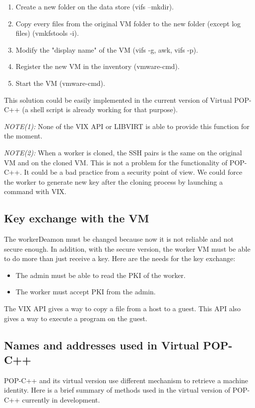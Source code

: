 \begin{enumerate}
\item Create a new folder on the data store (vifs --mkdir).
\item Copy every files from the original VM folder to the new folder (except log files) (vmkfstools -i).
\item Modify the "display name" of the VM (vifs -g, awk, vifs -p).
\item Register the new VM in the inventory (vmware-cmd).
\item Start the VM (vmware-cmd).
\end{enumerate}

This solution could be easily implemented in the current version of Virtual POP-C++ (a shell script is already working for that purpose). \s

\textit{NOTE(1):} None of the VIX API or LIBVIRT is able to provide this function for the moment. \s

\textit{NOTE(2):} When a worker is cloned, the SSH pairs is the same on the original VM and on the cloned VM. This is not a problem for the functionality of POP-C++. It could be a bad practice from a security point of view. We could force the worker to generate new key after the cloning process by launching a command with VIX.  

\subsection{Key exchange with the VM}
The workerDeamon must be changed because now it is not reliable and not secure enough. In addition, with the secure version, the worker VM must be able to do more than just receive a key.  Here are the needs for the key exchange:

\begin{itemize}
\item The admin must be able to read the PKI of the worker.
\item The worker must accept PKI from the admin.
\end{itemize}

The VIX API gives a way to copy a file from a host to a guest. This API also gives a way to execute a program on the guest.\s

\subsection{Names and addresses used in Virtual POP-C++}
POP-C++ and its virtual version use different mechanism to retrieve a machine identity. Here is a brief summary of methods used in the virtual version of POP-C++ currently in development.\s


